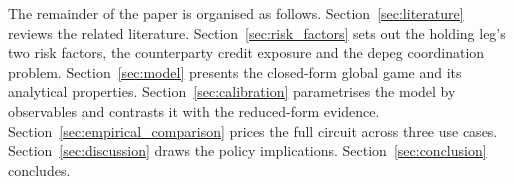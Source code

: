 The remainder of the paper is organised as follows. Section~\ref{sec:literature} reviews the related literature. Section~\ref{sec:risk_factors} sets out the holding leg's two risk factors, the counterparty credit exposure and the depeg coordination problem. Section~\ref{sec:model} presents the closed-form global game and its analytical properties. Section~\ref{sec:calibration} parametrises the model by observables and contrasts it with the reduced-form evidence. Section~\ref{sec:empirical_comparison} prices the full circuit across three use cases. Section~\ref{sec:discussion} draws the policy implications. Section~\ref{sec:conclusion} concludes.
